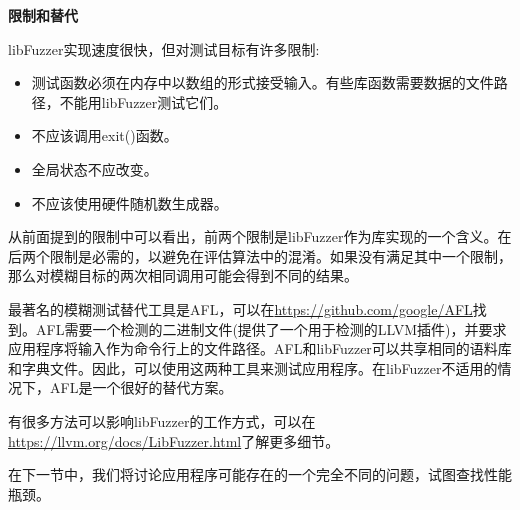 \hspace*{\fill} \par %
\textbf{限制和替代}

libFuzzer实现速度很快，但对测试目标有许多限制:\par


\begin{itemize}
\item 测试函数必须在内存中以数组的形式接受输入。有些库函数需要数据的文件路径，不能用libFuzzer测试它们。

\item 不应该调用exit()函数。

\item 全局状态不应改变。

\item 不应该使用硬件随机数生成器。
\end{itemize}

从前面提到的限制中可以看出，前两个限制是libFuzzer作为库实现的一个含义。在后两个限制是必需的，以避免在评估算法中的混淆。如果没有满足其中一个限制，那么对模糊目标的两次相同调用可能会得到不同的结果。\par

最著名的模糊测试替代工具是AFL，可以在\url{https://github.com/google/AFL}找到。AFL需要一个检测的二进制文件(提供了一个用于检测的LLVM插件)，并要求应用程序将输入作为命令行上的文件路径。AFL和libFuzzer可以共享相同的语料库和字典文件。因此，可以使用这两种工具来测试应用程序。在libFuzzer不适用的情况下，AFL是一个很好的替代方案。\par

有很多方法可以影响libFuzzer的工作方式，可以在\url{https://llvm.org/docs/LibFuzzer.html}了解更多细节。\par

在下一节中，我们将讨论应用程序可能存在的一个完全不同的问题，试图查找性能瓶颈。\par















































